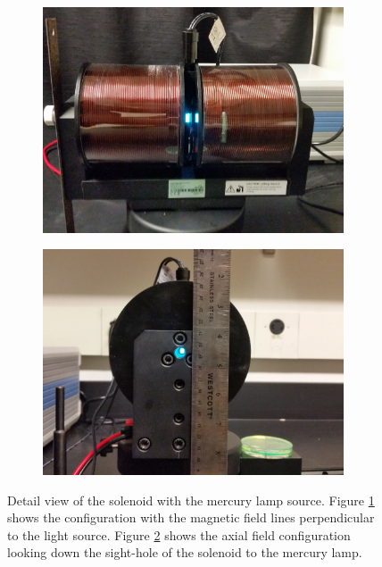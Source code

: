 \documentclass[twocolumn]{article}
\begin{document}
	\begin{figure}
		\centering
		\begin{subfigure}{0.5\textwidth}
			\includegraphics[width = 0.98\textwidth]{Images/PerpendicularView.jpg}
			\caption{}
			\label{subfig:PerpView}
		\end{subfigure}%
		\begin{subfigure}{0.5\textwidth}
			\includegraphics[width = 0.98\textwidth]{Images/AxialView.jpg}
			\caption{}
			\label{subfig:AxialView}
		\end{subfigure}%
		\caption{Detail view of the solenoid with the mercury lamp source. Figure \ref{subfig:PerpView} shows the configuration with the magnetic field lines perpendicular to the light source. Figure \ref{subfig:AxialView} shows the axial field configuration looking down the sight-hole of the solenoid to the mercury lamp.}
		\label{fig:SolenoidDetail}
	\end{figure}
	
\end{document}
